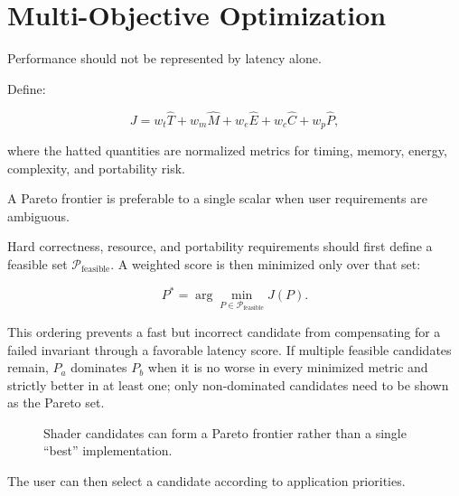 \documentclass[11pt,a4paper,oneside]{report}
\begin{document}
\section{Multi-Objective Optimization}

Performance should not be represented by latency alone.

Define:

\begin{equation}
J =
w_t \hat{T}
+w_m \hat{M}
+w_e \hat{E}
+w_c \hat{C}
+w_p \hat{P},
\end{equation}

where the hatted quantities are normalized metrics for timing, memory, energy, complexity,
and portability risk.

A Pareto frontier is preferable to a single scalar when user requirements are ambiguous.

Hard correctness, resource, and portability requirements should first define a feasible set
$\mathcal{P}_{\mathrm{feasible}}$. A weighted score is then minimized only over that set:

\begin{equation}
P^*=\arg\min_{P\in\mathcal{P}_{\mathrm{feasible}}}J(P).
\end{equation}

This ordering prevents a fast but incorrect candidate from compensating for a failed invariant
through a favorable latency score. If multiple feasible candidates remain, $P_a$ dominates $P_b$
when it is no worse in every minimized metric and strictly better in at least one; only
non-dominated candidates need to be shown as the Pareto set.

\begin{figure}[H]
\centering
{}
\caption{Shader candidates can form a Pareto frontier rather than a single ``best'' implementation.}
\end{figure}

The user can then select a candidate according to application priorities.
\end{document}
